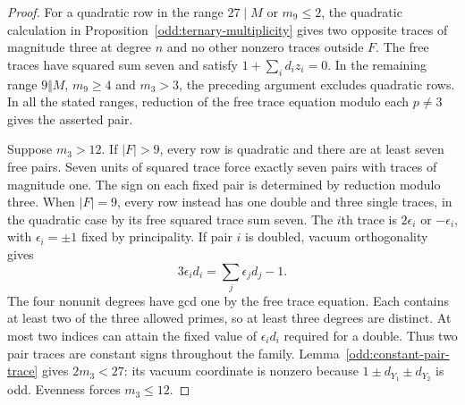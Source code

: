 \documentclass[11pt]{amsart}
\numberwithin{equation}{section}
\theoremstyle{definition}
\theoremstyle{plain}
\begin{document}
\begin{proof}
For a quadratic row in the range $27\mid M$ or $m_9\le2$, the
quadratic calculation in Proposition~\ref{odd:ternary-multiplicity}
gives two opposite traces of magnitude three at degree $n$ and
no other nonzero traces outside $F$. The free traces have squared
sum seven and satisfy $1+\sum_i d_i z_i=0$. In the remaining
range $9\Vert M$, $m_9\ge4$ and $m_3>3$, the preceding argument
excludes quadratic rows. In all the stated ranges, reduction of
the free trace equation modulo each $p\ne3$ gives the asserted pair.

Suppose $m_3>12$. If $|F|>9$, every row is quadratic and there
are at least seven free pairs. Seven units of squared trace force
exactly seven pairs with traces of magnitude one. The sign on each
fixed pair is determined by reduction modulo three.
When $|F|=9$, every row instead has one double and three single
traces, in the quadratic case by its free squared trace sum seven.
The $i$th trace is $2\epsilon_i$ or $-\epsilon_i$, with
$\epsilon_i=\pm1$ fixed by principality. If pair $i$ is doubled,
vacuum orthogonality gives
\[
             3\epsilon_i d_i=\sum_j\epsilon_j d_j-1 .
\]
The four nonunit degrees have gcd one by the free trace equation.
Each contains at least two of the three allowed primes, so at least
three degrees are distinct. At most two indices can attain the fixed
value of $\epsilon_i d_i$ required for a double.
Thus two pair traces are constant signs throughout the family.
Lemma~\ref{odd:constant-pair-trace} gives $2m_3<27$: its vacuum
coordinate is nonzero because $1\pm d_{Y_1}\pm d_{Y_2}$ is odd.
Evenness forces $m_3\le12$.
\end{proof}
\end{document}
